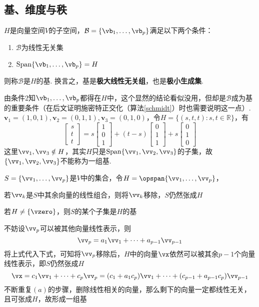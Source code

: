 \subsection{基、维度与秩}
\begin{definition}[基]
$H$是向量空间$V$的子空间，$\mathcal{B}=\{\vb_1,\dots,\vb_p\}$满足以下两个条件：
\begin{enumerate}
	\item $\mathcal{B}$为线性无关集
	\item $\mathrm{Span}\{\vb_1,\dots,\vb_p\}=H$
\end{enumerate}
则称$\mathcal{B}$是$H$的基. 换言之，基是\textbf{极大线性无关组}，也是\textbf{极小生成集}.
\end{definition}
由条件2知$\vb_1,\dots,\vb_p$都得在$H$中，这个显然的结论看似没用，但却是$\mathcal{B}$成为基的重要条件（在后文证明施密特正交化（算法\ref{schmidt}）时也需要说明这一点）.
$\mathbf{v}_1=(1,0,1),\mathbf{v}_2=(0,1,1),\mathbf{v}_3=(0,1,0)$，令$H=\{(s,t,t):s,t\in \mathbb{R}\}$，有
\[
\begin{bmatrix}s \\t \\t\end{bmatrix}=s\begin{bmatrix}1 \\0 \\1\end{bmatrix}+(t-s)\begin{bmatrix}0 \\1 \\1 \end{bmatrix}+s\begin{bmatrix}0 \\1 \\0 \end{bmatrix}\]
这里$\vv_1,\vv_3\notin H$，其实$H$只是$\mathrm{Span}\{\vv_1,\vv_2,\vv_3\}$的子集，故$\{\vv_1,\vv_2,\vv_3\}$不能称为一组基.
\begin{theorem}
$S=\{\vv_1,\dots,\vv_p\}$是$V$中的集合，令$H=\opspan\{\vv_1,\dots,\vv_p\}$，
\begin{partlist}
	\item 若$\vv_k$是$S$中其余向量的线性组合，则将$\vv_k$移除，$S$仍然张成$H$
	\item 若$H\ne\{\vzero\}$，则$S$的某个子集是$H$的基
\end{partlist}
\end{theorem}
\begin{analysis}不妨设$\vv_p$可以被其他向量线性表示，则
\[\vv_p=a_1\vv_1+\cdots+a_{p-1}\vv_{p-1}\]
将上式代入下式，可知将$\vv_p$移除后，$H$中的向量$\vx$依然可以被其余$p-1$个向量线性表示，即$S$仍然张成$H$
\[\vx=c_1\vv_1+\cdots+c_p\vv_p=(c_1+a_1c_p)\vv_1+\cdots+(c_{p-1}+a_{p-1}c_p)\vv_{p-1}\]
不断重复$(a)$的步骤，删除线性相关的向量，那么剩下的向量一定都线性无关，且可张成$H$，故形成一组基
\end{analysis}
